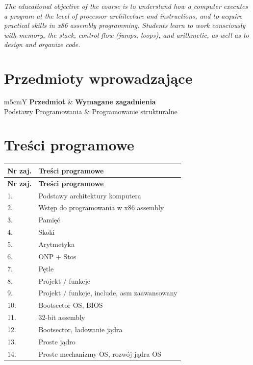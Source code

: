 \documentclass[12pt, a4paper]{article}
\newcommand{\thdrule}{\noalign{\global\setlength{\extrarowheight}{0pt}}}
\newcommand{\thdend}{\noalign{\global\setlength{\extrarowheight}{3pt}}}
\begin{document}
\textit{The educational objective of the course is to understand how a computer executes a program at the level of processor architecture and instructions, and to acquire practical skills in x86 assembly programming. Students learn to work consciously with memory, the stack, control flow (jumps, loops), and arithmetic, as well as to design and organize code.}


\section{Przedmioty wprowadzające}

{\scriptsize
\begin{tabularx}{\textwidth}{m{5cm}Y}
\thdrule\toprule
{} {\color{white}\textbf{Przedmiot}} & {\color{white}\textbf{Wymagane zagadnienia}} \\
\midrule\thdend
   Podstawy Programowania & Programowanie strukturalne \\
\bottomrule
\end{tabularx}}

\section{Treści programowe}

{\scriptsize
\begin{longtable}{m{1.5cm}m{14.5cm}}
\thdrule\toprule
\rowcolor{pjatkRed} {\color{white}\textbf{Nr zaj.}} & {\color{white}\textbf{Treści programowe}} \\
\midrule\thdend
\endfirsthead
\thdrule\toprule
\rowcolor{pjatkRed} {\color{white}\textbf{Nr zaj.}} & {\color{white}\textbf{Treści programowe}} \\
\midrule\thdend
\endhead
  \rowcolor{tableRowLight} 1. & Podstawy architektury komputera \\
  \rowcolor{tableRowAlt} 2. & Wstęp do programowania w x86 assembly \\
  \rowcolor{tableRowLight} 3. & Pamięć \\
  \rowcolor{tableRowAlt} 4. & Skoki \\
  \rowcolor{tableRowLight} 5. & Arytmetyka \\
  \rowcolor{tableRowAlt} 6. & ONP + Stos \\
  \rowcolor{tableRowLight} 7. & Pętle \\
  \rowcolor{tableRowAlt} 8. & Projekt / funkcje \\
  \rowcolor{tableRowLight} 9. & Projekt / funkcje, include, asm zaawansowany \\
  \rowcolor{tableRowAlt} 10. & Bootsector OS, BIOS \\
  \rowcolor{tableRowLight} 11. & 32-bit assembly \\
  \rowcolor{tableRowAlt} 12. & Bootsector, ładowanie jądra \\
  \rowcolor{tableRowLight} 13. & Proste jądro \\
  \rowcolor{tableRowAlt} 14. & Proste mechanizmy OS, rozwój jądra OS \\
\bottomrule
\end{longtable}}
\end{document}
